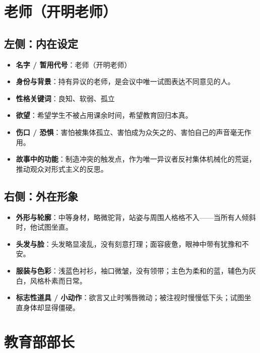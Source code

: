 \documentclass[11pt, a4paper]{article}
\begin{document}
	\newpage
	
	\section{老师（开明老师）}
	
	\subsection*{左侧：内在设定}
	
	\begin{itemize}[leftmargin=2em, itemsep=0.2em]
		\item \textbf{名字 / 暂用代号}：老师（开明老师）
		\item \textbf{身份与背景}：持有异议的老师，是会议中唯一试图表达不同意见的人。
		\item \textbf{性格关键词}：良知、软弱、孤立
		\item \textbf{欲望}：希望学生不被占用课余时间，希望教育回归本真。
		\item \textbf{伤口 / 恐惧}：害怕被集体孤立、害怕成为众矢之的、害怕自己的声音毫无作用。
		\item \textbf{故事中的功能}：制造冲突的触发点，作为唯一异议者反衬集体机械化的荒诞，推动观众对形式主义的反思。
	\end{itemize}
	
	\subsection*{右侧：外在形象}
	
	\begin{itemize}[leftmargin=2em, itemsep=0.2em]
		\item \textbf{外形与轮廓}：中等身材，略微驼背，站姿与周围人格格不入——当所有人倾斜时，他试图坐直。
		\item \textbf{头发与脸}：头发略显凌乱，没有刻意打理；面容疲惫，眼神中带有犹豫和不安。
		\item \textbf{服装与色彩}：浅蓝色衬衫，袖口微皱，没有领带；主色为柔和的蓝，辅色为灰白，风格朴素而日常。
		\item \textbf{标志性道具 / 小动作}：欲言又止时嘴唇微动；被注视时慢慢低下头；试图坐直身体却显得僵硬。
	\end{itemize}
	
	\newpage
	
	\section{教育部部长}
	
\end{document}
